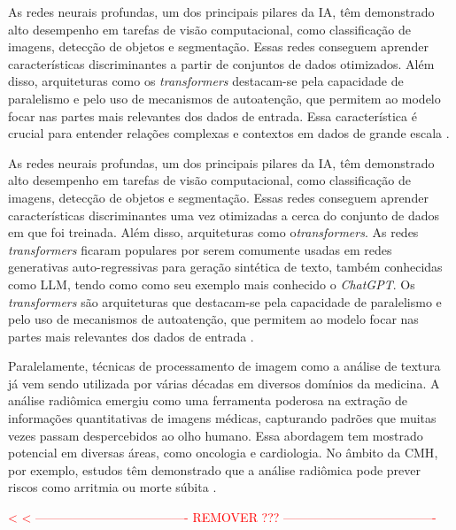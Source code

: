 As redes neurais profundas, um dos principais pilares da \gls{IA}, têm demonstrado alto desempenho em tarefas de visão computacional, como classificação de imagens, detecção de objetos e segmentação. Essas redes conseguem aprender características discriminantes a partir de conjuntos de dados otimizados. Além disso, arquiteturas como os \textit{transformers} destacam-se pela capacidade de paralelismo e pelo uso de mecanismos de autoatenção, que permitem ao modelo focar nas partes mais relevantes dos dados de entrada. Essa característica é crucial para entender relações complexas e contextos em dados de grande escala \cite{russell2020artificial}.

As redes neurais profundas, um dos principais pilares da \gls{IA}, têm demonstrado alto desempenho em tarefas de visão computacional, como classificação de imagens, detecção de objetos e segmentação. Essas redes conseguem aprender características discriminantes uma vez otimizadas a cerca do conjunto de dados em que foi treinada. Além disso, arquiteturas como o\textit{transformers}. As redes \textit{transformers} ficaram populares por serem comumente usadas em redes generativas auto-regressivas para geração sintética de texto, também conhecidas como \gls{LLM}, tendo como como seu exemplo mais conhecido o \textit{ChatGPT}. Os \textit{transformers} são arquiteturas que destacam-se pela capacidade de paralelismo e pelo uso de mecanismos de autoatenção, que permitem ao modelo focar nas partes mais relevantes dos dados de entrada \cite{russell2020artificial}.

Paralelamente, técnicas de processamento de imagem como a análise de textura já vem sendo utilizada por várias décadas em diversos domínios da medicina. A análise radiômica emergiu como uma ferramenta poderosa na extração de informações quantitativas de imagens médicas, capturando padrões que muitas vezes passam despercebidos ao olho humano. Essa abordagem tem mostrado potencial em diversas áreas, como oncologia e cardiologia. No âmbito da \gls{CMH}, por exemplo, estudos têm demonstrado que a análise radiômica pode prever riscos como arritmia ou morte súbita \cite{schofieldTextureAnalysisCardiovascular2019a}.


\textcolor{red}{< < ------------------------------------- REMOVER ??? ------------------------------------- }

